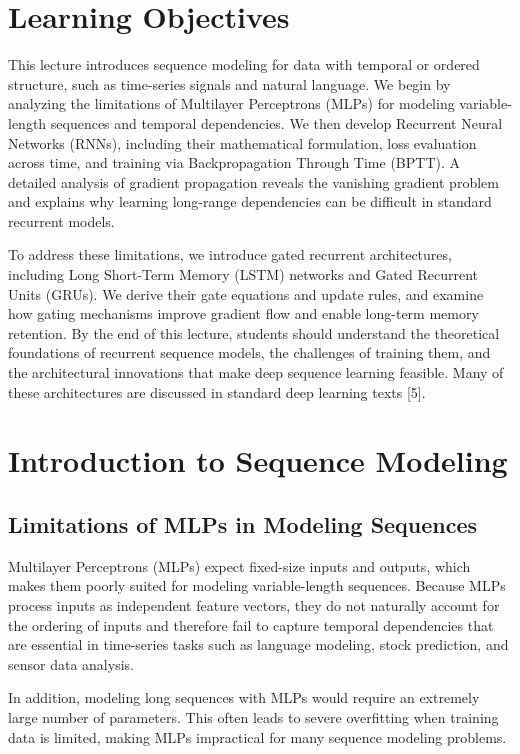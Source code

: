 \documentclass{article}
\renewcommand{\cite}[1]{[#1]}
\begin{document}
\section{Learning Objectives}

This lecture introduces sequence modeling for data with temporal or ordered structure, such as time-series signals and natural language. We begin by analyzing the limitations of Multilayer Perceptrons (MLPs) for modeling variable-length sequences and temporal dependencies. We then develop Recurrent Neural Networks (RNNs), including their mathematical formulation, loss evaluation across time, and training via Backpropagation Through Time (BPTT). A detailed analysis of gradient propagation reveals the vanishing gradient problem and explains why learning long-range dependencies can be difficult in standard recurrent models.

To address these limitations, we introduce gated recurrent architectures, including Long Short-Term Memory (LSTM) networks and Gated Recurrent Units (GRUs). We derive their gate equations and update rules, and examine how gating mechanisms improve gradient flow and enable long-term memory retention. By the end of this lecture, students should understand the theoretical foundations of recurrent sequence models, the challenges of training them, and the architectural innovations that make deep sequence learning feasible. Many of these architectures are discussed in standard deep learning texts \cite{5}.


\section{Introduction to Sequence Modeling}

\subsection*{Limitations of MLPs in Modeling Sequences}

Multilayer Perceptrons (MLPs) expect fixed-size inputs and outputs, which makes them poorly suited for modeling variable-length sequences. Because MLPs process inputs as independent feature vectors, they do not naturally account for the ordering of inputs and therefore fail to capture temporal dependencies that are essential in time-series tasks such as language modeling, stock prediction, and sensor data analysis. 

In addition, modeling long sequences with MLPs would require an extremely large number of parameters. This often leads to severe overfitting when training data is limited, making MLPs impractical for many sequence modeling problems.
\end{document}
